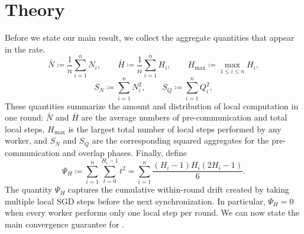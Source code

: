 \documentclass{article}
\newcommand{\eqdef}{\coloneqq}
\theoremstyle{plain}
\theoremstyle{definition}
\begin{document}
\section{Theory}\label{sec:theory}
% 
Before we state our main result, we collect the aggregate quantities that appear in the rate.
\begin{equation}\label{eq:-0-0-098uy8ygugf}%
    \bar N \eqdef \frac{1}{n}\sum_{i=1}^n N_i,
    \qquad
    \bar H \eqdef \frac{1}{n}\sum_{i=1}^n H_i,
    \qquad
    H_{\max} \eqdef \max_{1\leq i\leq n} H_i,
\end{equation}
% 
\begin{equation}\label{eq:98yf9d8yf0d_90uf09d}%
    S_N \eqdef \sum_{i=1}^n N_i^2,
    \qquad
    S_Q \eqdef \sum_{i=1}^n Q_i^2,
\end{equation}
These quantities summarize the amount and distribution of local computation in one round:
\(\bar N\) and \(\bar H\) are the average numbers of pre-communication and total local steps,
\(H_{\max}\) is the largest total number of local steps performed by any worker,
and \(S_N\) and \(S_Q\) are the corresponding squared aggregates for the pre-communication and overlap phases.
Finally, define
\begin{equation}\label{eq:Psi_H-defn}%
    \Psi_H
    \eqdef
    \sum_{i=1}^n\sum_{t=0}^{H_i-1} t^2
    =
    \sum_{i=1}^n \frac{(H_i-1)H_i(2H_i-1)}{6}.
\end{equation}
The quantity \(\Psi_H\) captures the cumulative within-round drift created by taking multiple local SGD steps before the next synchronization.
In particular, \(\Psi_H=0\) when every worker performs only one local step per round.
% 
% 
We can now state the main convergence guarantee for .
% 
\end{document}
